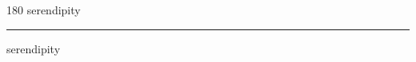 
\begin{frame}
\begin{center}
\begin{turn}{180}
{\fontsize{2.5cm}{1em}\selectfont serendipity}
\end{turn}
\vspace{1em}\par  
\hrule
\vspace{1em}\par  
{\fontsize{2.5cm}{1em}\selectfont serendipity}
\end{center}
\end{frame}
